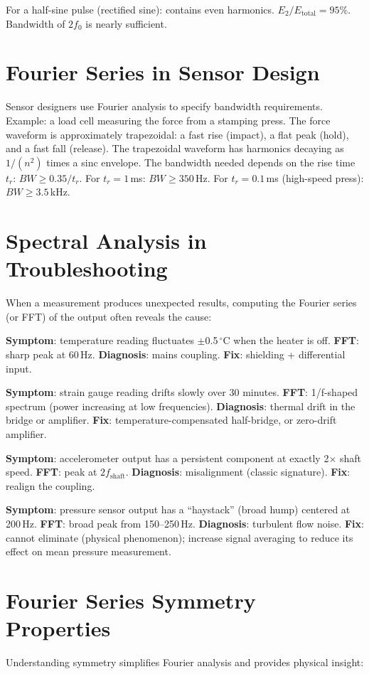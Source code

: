 \documentclass[11pt,letterpaper,twoside,openany]{book}
\newcommand{\degC}{\ensuremath{{}^{\circ}\text{C}}}
\begin{document}
For a half-sine pulse (rectified sine): contains even harmonics. $E_2/E_{\text{total}} = 95\%$. Bandwidth of $2f_0$ is nearly sufficient.

\section{Fourier Series in Sensor Design}
Sensor designers use Fourier analysis to specify bandwidth requirements. Example: a load cell measuring the force from a stamping press. The force waveform is approximately trapezoidal: a fast rise (impact), a flat peak (hold), and a fast fall (release). The trapezoidal waveform has harmonics decaying as $1/(n^2)$ times a sinc envelope. The bandwidth needed depends on the rise time $t_r$: $BW \geq 0.35/t_r$. For $t_r = 1$\,ms: $BW \geq 350$\,Hz. For $t_r = 0.1$\,ms (high-speed press): $BW \geq 3.5$\,kHz.

\section{Spectral Analysis in Troubleshooting}
When a measurement produces unexpected results, computing the Fourier series (or FFT) of the output often reveals the cause:

\textbf{Symptom}: temperature reading fluctuates $\pm$0.5\,\degC{} when the heater is off. \textbf{FFT}: sharp peak at 60\,Hz. \textbf{Diagnosis}: mains coupling. \textbf{Fix}: shielding + differential input.

\textbf{Symptom}: strain gauge reading drifts slowly over 30 minutes. \textbf{FFT}: 1/f-shaped spectrum (power increasing at low frequencies). \textbf{Diagnosis}: thermal drift in the bridge or amplifier. \textbf{Fix}: temperature-compensated half-bridge, or zero-drift amplifier.

\textbf{Symptom}: accelerometer output has a persistent component at exactly 2$\times$ shaft speed. \textbf{FFT}: peak at $2f_{\text{shaft}}$. \textbf{Diagnosis}: misalignment (classic signature). \textbf{Fix}: realign the coupling.

\textbf{Symptom}: pressure sensor output has a ``haystack'' (broad hump) centered at 200\,Hz. \textbf{FFT}: broad peak from 150--250\,Hz. \textbf{Diagnosis}: turbulent flow noise. \textbf{Fix}: cannot eliminate (physical phenomenon); increase signal averaging to reduce its effect on mean pressure measurement.
\section{Fourier Series Symmetry Properties}
Understanding symmetry simplifies Fourier analysis and provides physical insight:
\end{document}
